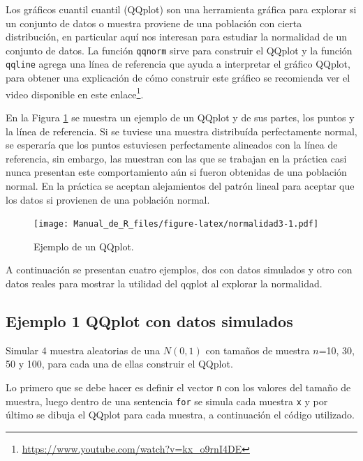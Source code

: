 \documentclass[10pt,]{krantz}
\renewcommand{\href}[2]{#2\footnote{\url{#1}}}
\begin{document}
Los gráficos cuantil cuantil (QQplot) son una herramienta gráfica para
explorar si un conjunto de datos o muestra proviene de una población con
cierta distribución, en particular aquí nos interesan para estudiar la
normalidad de un conjunto de datos. La función \texttt{qqnorm} sirve
para construir el QQplot y la función \texttt{qqline} agrega una línea
de referencia que ayuda a interpretar el gráfico QQplot, para obtener
una explicación de cómo construir este gráfico se recomienda ver el
video disponible en este
\href{https://www.youtube.com/watch?v=kx_o9rnI4DE}{enlace}.

En la Figura \ref{fig:normalidad3} se muestra un ejemplo de un QQplot y
de sus partes, los puntos y la línea de referencia. Si se tuviese una
muestra distribuída perfectamente normal, se esperaría que los puntos
estuviesen perfectamente alineados con la línea de referencia, sin
embargo, las muestran con las que se trabajan en la práctica casi nunca
presentan este comportamiento aún si fueron obtenidas de una población
normal. En la práctica se aceptan alejamientos del patrón lineal para
aceptar que los datos si provienen de una población normal.

\begin{figure}[htbp]
\centering
\texttt{[image: Manual\_de\_R\_files/figure-latex/normalidad3-1.pdf]}
\caption{\label{fig:normalidad3}Ejemplo de un QQplot.}
\end{figure}

A continuación se presentan cuatro ejemplos, dos con datos simulados y
otro con datos reales para mostrar la utilidad del qqplot al explorar la
normalidad.

\subsection*{Ejemplo 1 QQplot con datos
simulados}\label{ejemplo-1-qqplot-con-datos-simulados}


Simular 4 muestra aleatorias de una \(N(0, 1)\) con tamaños de muestra
\(n\)=10, 30, 50 y 100, para cada una de ellas construir el QQplot.

Lo primero que se debe hacer es definir el vector \texttt{n} con los
valores del tamaño de muestra, luego dentro de una sentencia
\texttt{for} se simula cada muestra \texttt{x} y por último se dibuja el
QQplot para cada muestra, a continuación el código utilizado.
\end{document}
